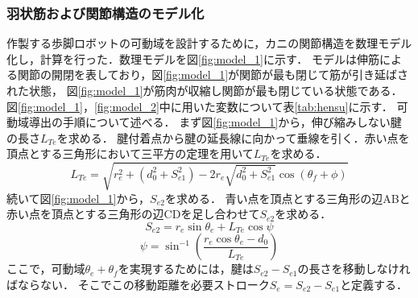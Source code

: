 \subsubsection{羽状筋および関節構造のモデル化}
作製する歩脚ロボットの可動域を設計するために，カニの関節構造を数理モデル化し，計算を行った．数理モデルを図\ref{fig:model_1}に示す．
モデルは伸筋による関節の開閉を表しており，図\ref{fig:model_1}が関節が最も閉じて筋が引き延ばされた状態，
図\ref{fig:model_1}が筋肉が収縮し関節が最も閉じている状態である．
図\ref{fig:model_1}，\ref{fig:model_2}中に用いた変数について表\ref{tab:hensu}に示す．
可動域導出の手順について述べる．
まず図\ref{fig:model_1}から，伸び縮みしない腱の長さ$L_{Te}$を求める．
腱付着点から腱の延長線に向かって垂線を引く．赤い点を頂点とする三角形において三平方の定理を用いて$L_{Te}$を求める．
\begin{equation}
  L_{Te} = \sqrt{r_e^2 + (d_0^2 + S_{e1}^2) - 2r_e\sqrt{d_0^2 + S_{e1}^2}\cos (\theta_f + \phi ) } 
\end{equation}
続いて図\ref{fig:model_1}から，$S_{e2}$を求める．
青い点を頂点とする三角形の辺ABと赤い点を頂点とする三角形の辺CDを足し合わせて$S_{e2}$を求める．
\begin{equation}
  S_{e2} = r_e\sin \theta_e + L_{Te}\cos \psi  
\end{equation}
\begin{equation}
  \psi  = \sin^{-1}({\dfrac{r_e \cos \theta_e - d_0}{L_{Te}}})
\end{equation}
ここで，可動域$\theta_e + \theta_f$を実現するためには，腱は$S_{e2} - S_{e1}$の長さを移動しなければならない．
そこでこの移動距離を必要ストローク$S_e = S_{e2} - S_{e1}$と定義する．

